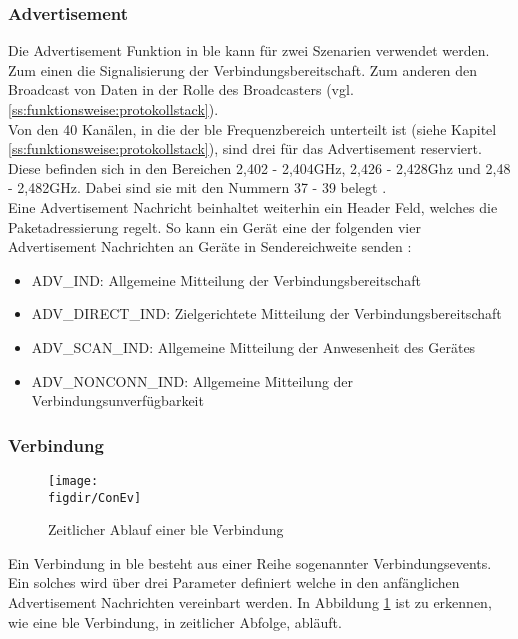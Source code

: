 \subsubsection{Advertisement}
\label{sss:funktionsweise:advertisement}

Die Advertisement Funktion in \ac{ble} kann für zwei Szenarien verwendet werden. Zum einen die Signalisierung der Verbindungsbereitschaft. Zum anderen den Broadcast von Daten in der Rolle des Broadcasters (vgl. \ref{ss:funktionsweise:protokollstack}).\\

\noindent Von den 40 Kanälen, in die der \ac{ble} Frequenzbereich unterteilt ist (siehe Kapitel \ref{ss:funktionsweise:protokollstack}), sind drei für das Advertisement reserviert. Diese befinden sich in den Bereichen 2,402 - 2,404GHz, 2,426 - 2,428Ghz und 2,48 - 2,482GHz. Dabei sind sie mit den Nummern 37 - 39 belegt \cite[Seite 16]{Townsend14:GSB}.\\

\noindent Eine Advertisement Nachricht beinhaltet weiterhin ein Header Feld, welches die Paketadressierung regelt. So kann ein Gerät eine der folgenden vier Advertisement Nachrichten an Geräte in Sendereichweite senden \cite[Seite 22]{Townsend14:GSB}:
\begin{itemize}
	\item{ADV\_IND: Allgemeine Mitteilung der Verbindungsbereitschaft}
	\item{ADV\_DIRECT\_IND: Zielgerichtete Mitteilung der Verbindungsbereitschaft}
	\item{ADV\_SCAN\_IND: Allgemeine Mitteilung der Anwesenheit des Gerätes}
	\item{ADV\_NONCONN\_IND: Allgemeine Mitteilung der Verbindungsunverfügbarkeit}
\end{itemize} 

\subsubsection{Verbindung}
\label{sss:funktionsweise:verbindung}   

\begin{figure}[!b]
	\centering
	\texttt{[image: \\figdir/ConEv]}
	\caption{Zeitlicher Ablauf einer \ac{ble} Verbindung \cite[Seite 22]{Townsend14:GSB}}
	\label{FIG:ConEv}
\end{figure}

Ein Verbindung in \ac{ble} besteht aus einer Reihe sogenannter Verbindungsevents. Ein solches wird über drei Parameter definiert welche in den anfänglichen Advertisement Nachrichten vereinbart werden. In Abbildung \ref{FIG:ConEv} ist zu erkennen, wie eine \ac{ble} Verbindung, in zeitlicher Abfolge, abläuft.\\



